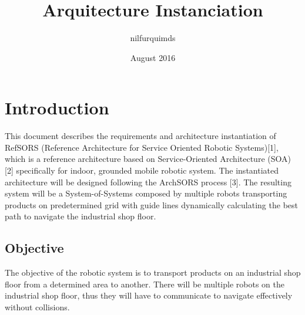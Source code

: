 \documentclass{article}
\title{Arquitecture Instanciation}
\author{nilfurquimds}
\date{August 2016}
\begin{document}
\maketitle

\section*{Introduction}
This document describes the requirements and architecture instantiation of RefSORS (Reference Architecture for Service Oriented Robotic Systems)[1], which is a reference architecture based on Service-Oriented Architecture (SOA) [2] specifically for indoor, grounded mobile robotic system. The instantiated architecture will be designed following the ArchSORS process [3]. The resulting system will be a System-of-Systems composed by multiple robots transporting products on predetermined grid with guide lines dynamically calculating the best path to navigate the industrial shop floor.

\subsection*{Objective}
The objective of the robotic system is to transport products on an industrial shop floor from a determined area to another. There will be multiple robots on the industrial shop floor, thus they will have to communicate to navigate effectively without collisions.










\end{document}
